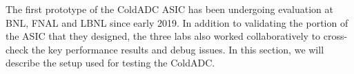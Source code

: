 \label{sec:2}


The first prototype of the ColdADC ASIC has been undergoing evaluation at BNL, FNAL and LBNL since early 2019. In addition to validating the portion of the ASIC that they designed, the three labs also worked collaboratively to cross-check the key performance results and debug issues. In this section, we will describe the setup used for testing the ColdADC.
